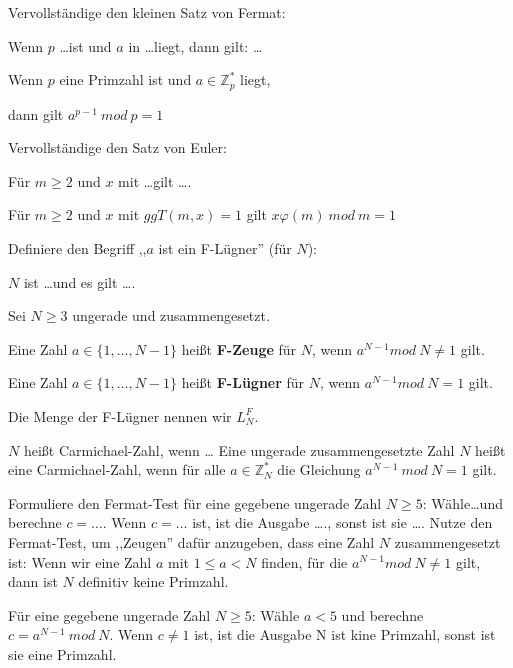 \documentclass[avery5371, frame]{flashcards}
\begin{document}
\begin{flashcard}[Zahlentheorie]{Vervollständige den kleinen Satz von Fermat:

        Wenn $p$ \dots ist und $a$ in \dots liegt, dann gilt: \dots}
    Wenn $p$ eine Primzahl ist und $a\in\mathbb{Z}^*_p$ liegt,

    dann gilt $a^{p-1}\ mod\ p= 1$
\end{flashcard}

\begin{flashcard}[Zahlentheorie]{ Vervollständige den Satz von Euler:

        Für $m\geq 2$ und $x$ mit \dots gilt \dots .}
    Für $m\geq 2$ und $x$ mit $ggT(m,x) = 1$ gilt $x\varphi(m)\ mod\ m=1$
\end{flashcard}

\begin{flashcard}[Primzahlen]{Definiere den Begriff ,,$a$ ist ein F-Lügner'' (für $N$):

        $N$ ist \dots und es gilt \dots .}
    Sei $N\geq 3$ ungerade und zusammengesetzt.

    Eine Zahl $a\in\{1,\dots,N-1\}$ heißt \textbf{F-Zeuge} für $N$, wenn $a^{N-1} mod\ N\not= 1$ gilt.

    Eine Zahl $a\in\{1,\dots,N-1\}$ heißt \textbf{F-Lügner} für $N$, wenn $a^{N-1} mod\ N=1$ gilt.

    Die Menge der F-Lügner nennen wir $L^F_N$.
\end{flashcard}

\begin{flashcard}[Primzahlen]{$N$ heißt Carmichael-Zahl, wenn \dots}
    Eine ungerade zusammengesetzte Zahl $N$ heißt eine Carmichael-Zahl, wenn für alle $a\in\mathbb{Z}^*_N$ die Gleichung $a^{N-1}\ mod\ N= 1$ gilt.
\end{flashcard}

\begin{flashcard}[Primzahlen]{Formuliere den Fermat-Test für eine gegebene ungerade Zahl $N\geq 5$: Wähle\dots und berechne $c=\dots$. Wenn $c=\dots$ ist, ist die Ausgabe \dots., sonst ist sie \dots .}
    Nutze den Fermat-Test, um ,,Zeugen'' dafür anzugeben, dass eine Zahl $N$ zusammengesetzt ist: Wenn wir eine Zahl $a$ mit $1\leq a < N$ finden, für die $a^{N-1} mod\ N\not=1$ gilt, dann ist $N$ definitiv keine Primzahl.

    Für eine gegebene ungerade Zahl $N\geq 5$: Wähle $a<5$ und berechne $c=a^{N-1}\ mod\ N$. Wenn $c\not=1$ ist, ist die Ausgabe N ist kine Primzahl, sonst ist sie eine Primzahl.
\end{flashcard}
\end{document}
